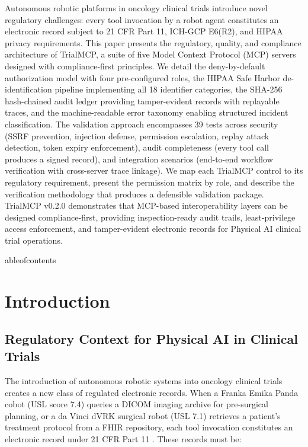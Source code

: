 \documentclass[10pt,letterpaper]{article}
\begin{document}
Autonomous robotic platforms in oncology clinical trials introduce novel regulatory challenges: every tool invocation by a robot agent constitutes an electronic record subject to 21 CFR Part 11, ICH-GCP E6(R2), and HIPAA privacy requirements. This paper presents the regulatory, quality, and compliance architecture of TrialMCP, a suite of five Model Context Protocol (MCP) servers designed with compliance-first principles. We detail the deny-by-default authorization model with four pre-configured roles, the HIPAA Safe Harbor de-identification pipeline implementing all 18 identifier categories, the SHA-256 hash-chained audit ledger providing tamper-evident records with replayable traces, and the machine-readable error taxonomy enabling structured incident classification. The validation approach encompasses 39 tests across security (SSRF prevention, injection defense, permission escalation, replay attack detection, token expiry enforcement), audit completeness (every tool call produces a signed record), and integration scenarios (end-to-end workflow verification with cross-server trace linkage). We map each TrialMCP control to its regulatory requirement, present the permission matrix by role, and describe the verification methodology that produces a defensible validation package. TrialMCP v0.2.0 demonstrates that MCP-based interoperability layers can be designed compliance-first, providing inspection-ready audit trails, least-privilege access enforcement, and tamper-evident electronic records for Physical AI clinical trial operations.

\vspace{8pt}

	ableofcontents

\section{Introduction}

\subsection{Regulatory Context for Physical AI in Clinical Trials}

The introduction of autonomous robotic systems into oncology clinical trials creates a new class of regulated electronic records. When a Franka Emika Panda cobot (USL score 7.4) queries a DICOM imaging archive for pre-surgical planning, or a da Vinci dVRK surgical robot (USL 7.1) retrieves a patient's treatment protocol from a FHIR repository, each tool invocation constitutes an electronic record under 21 CFR Part 11 \cite{cfr21part11}. These records must be:
\end{document}
